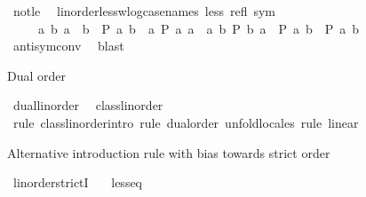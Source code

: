 \begin{isabellebody}
\ not{\isacharunderscore}{\kern0pt}le\ \isacommand{{\isachardot}{\kern0pt}}\isamarkupfalse%
%
\endisatagproof
{\isafoldproof}%
%
\isadelimproof
\isanewline
%
\endisadelimproof
\isanewline
{}\isamarkupfalse%
\ linorder{\isacharunderscore}{\kern0pt}less{\isacharunderscore}{\kern0pt}wlog{\isacharbrackleft}{\kern0pt}case{\isacharunderscore}{\kern0pt}names\ less\ refl\ sym{\isacharbrackright}{\kern0pt}{\isacharcolon}{\kern0pt}\isanewline
\ \ \ \ \ {\isachardoublequoteopen}{\isasymlbrakk}{\isasymAnd}a\ b{\isachardot}{\kern0pt}\ a\ {\isacharless}{\kern0pt}\ b\ {\isasymLongrightarrow}\ P\ a\ b{\isacharsemicolon}{\kern0pt}\ \ {\isasymAnd}a{\isachardot}{\kern0pt}\ P\ a\ a{\isacharsemicolon}{\kern0pt}\ \ {\isasymAnd}a\ b{\isachardot}{\kern0pt}\ P\ b\ a\ {\isasymLongrightarrow}\ P\ a\ b{\isasymrbrakk}\ {\isasymLongrightarrow}\ P\ a\ b{\isachardoublequoteclose}\isanewline
%
\isadelimproof
\ \ %
\endisadelimproof
%
\isatagproof
{}\isamarkupfalse%
\ antisym{\isacharunderscore}{\kern0pt}conv{}\ \isamarkupfalse%
\ blast%
\endisatagproof
{\isafoldproof}%
%
\isadelimproof
%
\endisadelimproof
%
\begin{isamarkuptext}%
Dual order%
\end{isamarkuptext}\isamarkuptrue%
\isamarkupfalse%
\ dual{\isacharunderscore}{\kern0pt}linorder{\isacharcolon}{\kern0pt}\isanewline
\ \ {\isachardoublequoteopen}class{\isachardot}{\kern0pt}linorder\ {\isacharparenleft}{\kern0pt}{\isasymge}{\isacharparenright}{\kern0pt}\ {\isacharparenleft}{\kern0pt}{\isachargreater}{\kern0pt}{\isacharparenright}{\kern0pt}{\isachardoublequoteclose}\isanewline
%
\isadelimproof
%
\endisadelimproof
%
\isatagproof
{}\isamarkupfalse%
\ {\isacharparenleft}{\kern0pt}rule\ class{\isachardot}{\kern0pt}linorder{\isachardot}{\kern0pt}intro{\isacharcomma}{\kern0pt}\ rule\ dual{\isacharunderscore}{\kern0pt}order{\isacharparenright}{\kern0pt}\ {\isacharparenleft}{\kern0pt}unfold{\isacharunderscore}{\kern0pt}locales{\isacharcomma}{\kern0pt}\ rule\ linear{\isacharparenright}{\kern0pt}%
\endisatagproof
{\isafoldproof}%
%
\isadelimproof
\isanewline
%
\endisadelimproof
\isanewline
{}\isamarkupfalse%
%
\begin{isamarkuptext}%
Alternative introduction rule with bias towards strict order%
\end{isamarkuptext}\isamarkuptrue%
\isamarkupfalse%
\ linorder{\isacharunderscore}{\kern0pt}strictI{\isacharcolon}{\kern0pt}\isanewline
\ \ \ less{\isacharunderscore}{\kern0pt}eq\ {\isacharparenleft}{\kern0pt}\ {\isachardoublequoteopen}\isactrlbold {\isasymle}{\isachardoublequoteclose}\ {}{}{\isacharparenright}{\kern0pt}\isanewline

\end{isabellebody}
